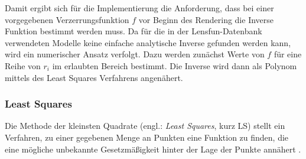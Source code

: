 Damit ergibt sich für die Implementierung die Anforderung, dass bei einer vorgegebenen Verzerrungsfunktion $f$ vor Beginn des Rendering die Inverse Funktion bestimmt werden muss. Da für die in der Lensfun-Datenbank verwendeten Modelle keine einfache analytische Inverse gefunden werden kann, wird ein numerischer Ansatz verfolgt. Dazu werden zunächst Werte von $f$ für eine Reihe von $r_i$ im erlaubten Bereich bestimmt. Die Inverse wird dann als Polynom mittels des Least Squares Verfahrens angenähert.


\subsubsection{Least Squares}

Die Methode der kleinsten Quadrate (engl.: \emph{Least Squares}, kurz LS) stellt ein Verfahren, zu einer gegebenen Menge an Punkten eine Funktion zu finden, die eine mögliche unbekannte Gesetzmäßigkeit hinter der Lage der Punkte annähert \cite{lsq_wolfram}.

